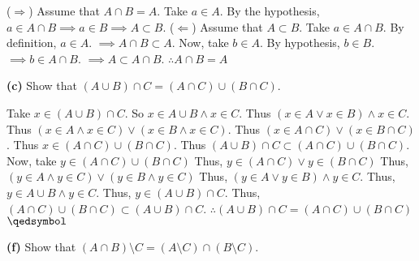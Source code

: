 \documentclass[12pt]{article}
\begin{document}
\begin{solution}\newline
($\Rightarrow$) Assume that $A\cap B = A$.\newline
Take $a\in A$.\newline
By the hypothesis, $a\in A\cap B\implies a\in B \implies A\subset B$.\newline
($\Leftarrow$) Assume that $A\subset B$.\newline
Take $a\in A\cap B$.\newline
By definition, $a\in A$.\newline
$\implies A\cap B\subset A$.\newline
Now, take $b\in A$.\newline
By hypothesis, $b\in B$.\newline
$\implies b\in A\cap B$.\newline
$\implies A\subset A\cap B$.\newline
$\therefore A\cap B = A$\flushright \qedsymbol
\end{solution}
\begin{subproblem}\textbf{(c)}
Show that $(A \cup B) \cap C = (A \cap C)\cup (B \cap C)$.
\end{subproblem}

\begin{solution}\newline
Take $x\in (A\cup B)\cap C$.\newline
So $x\in A\cup B\land x\in C$.\newline
Thus $(x\in A \lor x\in B) \land x\in C$.\newline
Thus $(x\in A\land x\in C)\lor (x\in B\land x\in C)$.\newline
Thus $(x\in A\cap C) \lor (x \in B\cap C)$.\newline
Thus $x\in (A\cap C)\cup (B\cap C)$.\newline
Thus $(A\cup B)\cap C\subset (A\cap C)\cup (B\cap C)$.\newline\newline
Now, take $y\in(A\cap C)\cup (B\cap C)$\newline
Thus, $y\in (A\cap C)\lor y\in (B\cap C)$\newline
Thus, $(y\in A \land y\in C) \lor (y\in B\land y\in C)$\newline
Thus, $(y\in A\lor y\in B) \land y\in C$.\newline
Thus, $y\in A\cup B \land y\in C$.\newline
Thus, $y\in (A\cup B)\cap C$.\newline
Thus, $(A\cap C)\cup (B\cap C) \subset (A\cup B) \cap C$.\newline
$\therefore (A\cup B) \cap C = (A\cap C)\cup (B\cap C)$\flushright$\qedsymbol$
\end{solution}
\newpage
\begin{subproblem}\textbf{(f)}
Show that $(A \cap B) \setminus C = (A \setminus C) \cap (B \setminus C)$.
\end{subproblem}
\end{document}
